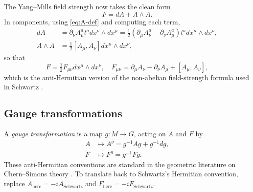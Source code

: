 \documentclass[11pt]{article}
\theoremstyle{definition}
\numberwithin{theorem}{section}
\numberwithin{equation}{section}
\let\del\partial
\begin{document}
\noindent The Yang--Mills field strength now takes the clean form
\begin{equation}\label{eq:F-def}
F = dA + A\wedge A.
\end{equation}
In components, using \eqref{eq:A-def} and computing each term,
\begin{align*}
dA &= \del_\nu A_\mu^a t^a dx^\nu \wedge dx^\mu = \tfrac{1}{2}(\del_\mu A_\nu^a - \del_\nu A_\mu^a)t^a dx^\mu\wedge dx^\nu, \\
A\wedge A &= \tfrac{1}{2}[A_\mu,A_\nu]dx^\mu\wedge dx^\nu,
\end{align*}
so that
\begin{equation}\label{eq:F-components}
F = \tfrac{1}{2}F_{\mu\nu}dx^\mu\wedge dx^\nu, \quad F_{\mu\nu} = \del_\mu A_\nu - \del_\nu A_\mu + [A_\mu,A_\nu],
\end{equation}
which is the anti-Hermitian version of the non-abelian field-strength formula used in Schwartz \cite{Schwartz2014QFT}.

\subsection{Gauge transformations}

A \emph{gauge transformation} is a map $g:M\to G$, acting on $A$ and $F$ by
\begin{align}
A &\longmapsto A^g = g^{-1}Ag + g^{-1}dg, \label{eq:gauge-A}\\
F &\longmapsto F^g = g^{-1}Fg.\label{eq:gauge-F}
\end{align}
These anti-Hermitian conventions are standard in the geometric literature on Chern--Simons theory \cite{Freed1995CSnotes, Witten1989Jones}. To translate back to Schwartz's Hermitian convention, replace $A_{\text{here}}=-iA_{\text{Schwartz}}$ and $F_{\text{here}}=-iF_{\text{Schwartz}}$.

\medskip
\end{document}
